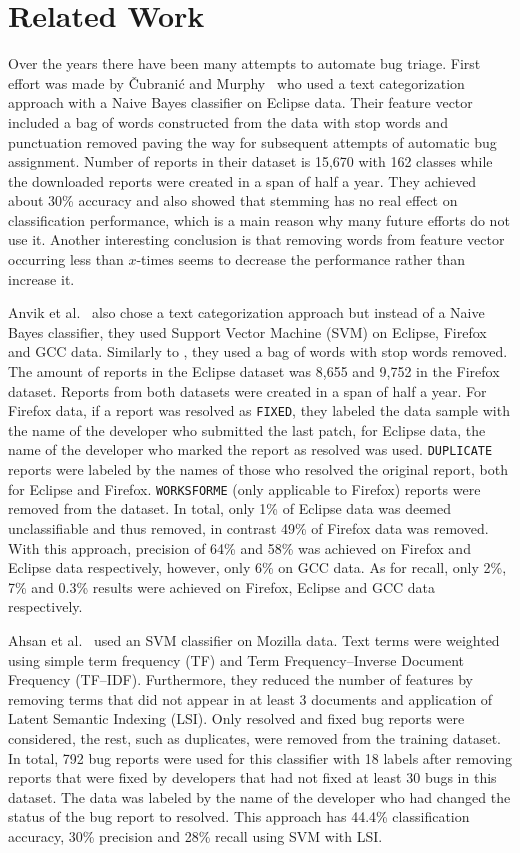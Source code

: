 \chapter{Related Work}
\label{chapter:related-work}

Over the years there have been many attempts to automate bug triage. First effort was made by Čubranić and Murphy~\cite{Murphy} who used a text categorization approach with a Naive Bayes classifier on Eclipse data. Their feature vector included a bag of words constructed from the data with stop words and punctuation removed paving the way for subsequent attempts of automatic bug assignment. Number of reports in their dataset is 15,670 with 162 classes while the downloaded reports were created in a span of half a year. They achieved about 30\% accuracy and also showed that stemming has no real effect on classification performance, which is a main reason why many future efforts do not use it. Another interesting conclusion is that removing words from feature vector occurring less than $x$-times seems to decrease the performance rather than increase it.

Anvik et al.~\cite{Anvik2006} also chose a text categorization approach but instead of a Naive Bayes classifier, they used Support Vector Machine (SVM) on Eclipse, Firefox and GCC data. Similarly to \cite{Murphy}, they used a bag of words with stop words removed. The amount of reports in the Eclipse dataset was 8,655 and 9,752 in the Firefox dataset. Reports from both datasets were created in a span of half a year. For Firefox data, if a report was resolved as \texttt{FIXED}, they labeled the data sample with the name of the developer who submitted the last patch, for Eclipse data, the name of the developer who marked the report as resolved was used. \texttt{DUPLICATE} reports were labeled by the names of those who resolved the original report, both for Eclipse and Firefox. \texttt{WORKSFORME} (only applicable to Firefox) reports were removed from the dataset. In total, only 1\% of Eclipse data was deemed unclassifiable and thus removed, in contrast 49\% of Firefox data was removed. With this approach, precision of 64\% and 58\% was achieved on Firefox and Eclipse data respectively, however, only 6\% on GCC data. As for recall, only 2\%, 7\% and 0.3\% results were achieved on Firefox, Eclipse and GCC data respectively.

Ahsan et al.~\cite{Ahsan2009} used an SVM classifier on Mozilla data. Text terms were weighted using simple term frequency (TF) and Term Frequency--Inverse Document Frequency (TF--IDF). Furthermore, they reduced the number of features by removing terms that did not appear in at least 3 documents and application of Latent Semantic Indexing (LSI). Only resolved and fixed bug reports were considered, the rest, such as duplicates, were removed from the training dataset. In total, 792 bug reports were used for this classifier with 18 labels after removing reports that were fixed by developers that had not fixed at least 30 bugs in this dataset. The data was labeled by the name of the developer who had changed the status of the bug report to resolved. This approach has 44.4\% classification accuracy, 30\% precision and 28\% recall using SVM with LSI.

